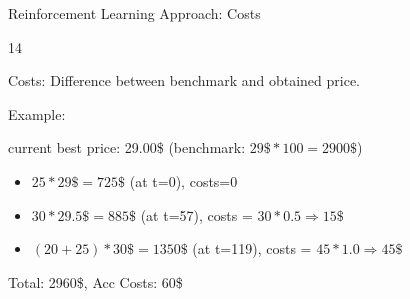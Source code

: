 \documentclass[10pt]{beamer}
\begin{document}
\begin{frame}[fragile]{Reinforcement Learning Approach: Costs}
\begin{overlayarea}{\textwidth}{14\baselineskip}


Costs: Difference between benchmark and obtained price.
\vspace{2mm}

\vspace{2mm}

Example:

current best price: {\color{mygreen}29.00\$} (benchmark: $29\$ * 100 = 2900\$$)

\begin{itemize}
\item $25*29\$ = 725\$$  (at t=0), costs=0
\item $30*29.5\$ = 885\$$  (at t=57), costs = $30*0.5 \Rightarrow 15\$$
\item $(20+25)*30\$ = 1350\$$   (at t=119), costs = $45*1.0 \Rightarrow 45\$$
\end{itemize}
Total: 2960\$,  Acc Costs: 60\$

\end{overlayarea}
\end{frame}
\end{document}

